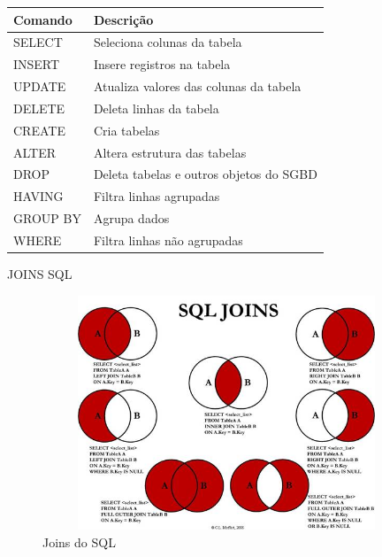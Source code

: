 \begin{frame}
	\begin{table}[]
		\begin{tabular}{|l|l|}
		\hline
			\textbf{Comando} & \textbf{Descrição}                      \\ \hline
			SELECT           & Seleciona colunas da tabela             \\ \hline
			INSERT           & Insere registros na tabela              \\ \hline
			UPDATE           & Atualiza valores das colunas da tabela  \\ \hline
			DELETE           & Deleta linhas da tabela                 \\ \hline
			CREATE           & Cria tabelas                            \\ \hline
			ALTER            & Altera estrutura das tabelas            \\ \hline
			DROP             & Deleta tabelas e outros objetos do SGBD \\ \hline
			HAVING           & Filtra linhas agrupadas                 \\ \hline
			GROUP BY         & Agrupa dados                            \\ \hline
			WHERE            & Filtra linhas não agrupadas             \\ \hline
		\end{tabular}
	\end{table}
\end{frame}

\begin{frame}
	\begin{block}{JOINS SQL}
		\begin{figure}[!htb]
			\centering	  				
			\includegraphics[height=7cm, width = 11cm]{./pic/sqlJoins.jpg}
			\caption{Joins do SQL}
			\label{fig_Joins_sql}
		\end{figure}
	\end{block}
\end{frame}

